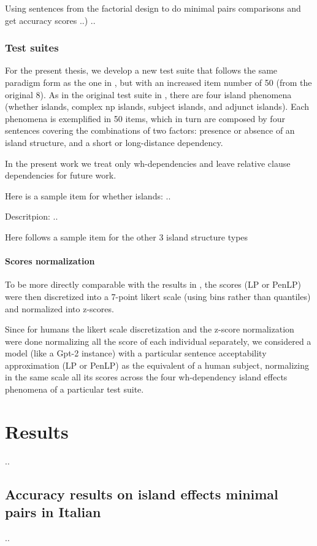 Using sentences from the factorial design to do minimal pairs comparisons and get accuracy scores ..)
..

\subsection{Test suites}

For the present thesis, we develop a new test suite that follows the same paradigm form as the one in \citet{sprouse2016experimental}, but with an increased item number of 50 (from the original 8). As in the original test suite in \citet{sprouse2016experimental}, there are four island phenomena (whether islands, complex np islands, subject islands, and adjunct islands). Each phenomena is exemplified in 50 items, which in turn are composed by four sentences covering the combinations of two factors: presence or absence of an island structure, and a short or long-distance dependency.

In the present work we treat only wh-dependencies and leave relative clause dependencies for future work.

Here is a sample item for whether islands:
..

Descritpion: ..

Here follows a sample item for the other 3 island structure types

\subsubsection{Scores normalization}

To be more directly comparable with the results in \citet{sprouse2016experimental}, the scores (LP or PenLP) were then discretized into a 7-point likert scale (using bins rather than quantiles) and normalized into z-scores.

Since for humans the likert scale discretization and the z-score normalization were done normalizing all the score of each individual separately, we considered a model (like a Gpt-2 instance) with a particular sentence acceptability approximation (LP or PenLP) as the equivalent of a human subject, normalizing in the same scale all its scores across the four wh-dependency island effects phenomena of a particular test suite.

\chapter{Results}
..

\section{Accuracy results on island effects minimal pairs in Italian}
..

